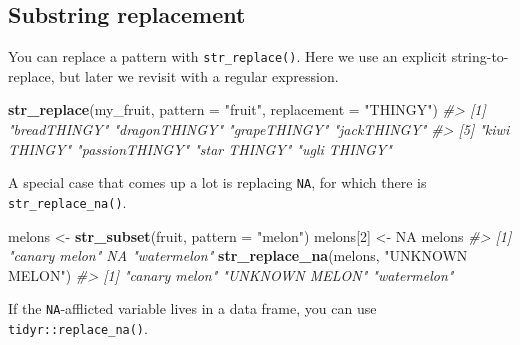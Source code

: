 \documentclass[
]{book}
\newenvironment{Shaded}{\begin{snugshade}}{\end{snugshade}}
\newcommand{\CommentTok}[1]{\textcolor[rgb]{0.56,0.35,0.01}{\textit{#1}}}
\newcommand{\DataTypeTok}[1]{\textcolor[rgb]{0.13,0.29,0.53}{#1}}
\newcommand{\DecValTok}[1]{\textcolor[rgb]{0.00,0.00,0.81}{#1}}
\newcommand{\KeywordTok}[1]{\textcolor[rgb]{0.13,0.29,0.53}{\textbf{#1}}}
\newcommand{\NormalTok}[1]{#1}
\newcommand{\OperatorTok}[1]{\textcolor[rgb]{0.81,0.36,0.00}{\textbf{#1}}}
\newcommand{\OtherTok}[1]{\textcolor[rgb]{0.56,0.35,0.01}{#1}}
\newcommand{\StringTok}[1]{\textcolor[rgb]{0.31,0.60,0.02}{#1}}
\begin{document}
\hypertarget{substring-replacement}{%
\subsection{Substring replacement}\label{substring-replacement}}

You can replace a pattern with \texttt{str\_replace()}. Here we use an explicit string-to-replace, but later we revisit with a regular expression.

\begin{Shaded}
\begin{Highlighting}[]
\KeywordTok{str_replace}\NormalTok{(my_fruit, }\DataTypeTok{pattern =} \StringTok{"fruit"}\NormalTok{, }\DataTypeTok{replacement =} \StringTok{"THINGY"}\NormalTok{)}
\CommentTok{#> [1] "breadTHINGY"   "dragonTHINGY"  "grapeTHINGY"   "jackTHINGY"   }
\CommentTok{#> [5] "kiwi THINGY"   "passionTHINGY" "star THINGY"   "ugli THINGY"}
\end{Highlighting}
\end{Shaded}

A special case that comes up a lot is replacing \texttt{NA}, for which there is \texttt{str\_replace\_na()}.

\begin{Shaded}
\begin{Highlighting}[]
\NormalTok{melons <-}\StringTok{ }\KeywordTok{str_subset}\NormalTok{(fruit, }\DataTypeTok{pattern =} \StringTok{"melon"}\NormalTok{)}
\NormalTok{melons[}\DecValTok{2}\NormalTok{] <-}\StringTok{ }\OtherTok{NA}
\NormalTok{melons}
\CommentTok{#> [1] "canary melon" NA             "watermelon"}
\KeywordTok{str_replace_na}\NormalTok{(melons, }\StringTok{"UNKNOWN MELON"}\NormalTok{)}
\CommentTok{#> [1] "canary melon"  "UNKNOWN MELON" "watermelon"}
\end{Highlighting}
\end{Shaded}

If the \texttt{NA}-afflicted variable lives in a data frame, you can use \texttt{tidyr::replace\_na()}.

\begin{Shaded}
\end{Shaded}
\end{document}
